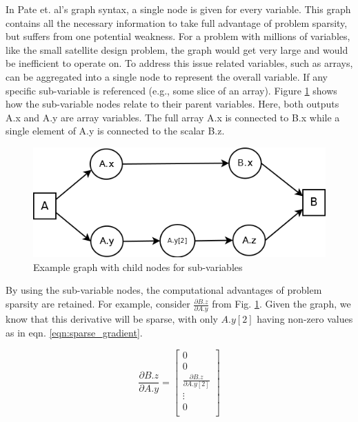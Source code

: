 \documentclass[]{aiaa-tc} %
\begin{document}
    In Pate et. al's graph syntax, a single node is given for every variable. This graph contains all the
    necessary information to take full advantage of problem sparsity, but suffers from one potential
    weakness. For a problem with millions of  variables, like the small satellite design problem,
    the graph would get very large and would be inefficient to operate on. To address this issue
    related variables, such as arrays, can be aggregated into a single node to represent the
    overall variable. If any specific sub-variable is referenced (e.g., some slice of an array).
    Figure \ref{fig:subvars} shows how the sub-variable nodes relate to their parent variables. Here,
    both outputs A.x and A.y are array variables. The full array A.x is connected to
    B.x while a single element of A.y is connected to the scalar B.z.

    \begin{figure}[!htb]\begin{center}
      \includegraphics[width=.8\textwidth]{images/Graph1}
      \caption{ Example graph with child nodes for sub-variables \label{fig:subvars}}
    \end{center}\end{figure}

    By using the sub-variable nodes, the computational advantages of problem sparsity are retained. For example,
    consider $\frac{\partial B.z}{\partial A.y}$ from Fig. \ref{fig:subvars}. Given the graph, we know that
    this derivative will be sparse, with only $A.y[2]$ having non-zero values as in eqn.  \ref{eqn:sparse_gradient}.

    \begin{equation}
        \frac{\partial B.z}{\partial A.y} =
        \begin{bmatrix}
            0 \\
            0 \\
            \frac{\partial B.z}{\partial A.y[2]} \\
            \vdots \\
            0 \\
        \end{bmatrix}
        \label{eqn:sparse_gradient}
    \end{equation}
\end{document}

